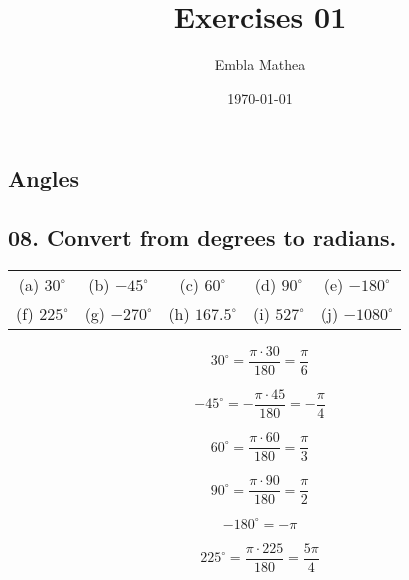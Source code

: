 \documentclass[12pt, a4paper]{article}
\title{Exercises 01}
\author{Embla Mathea}
\date{\today}
\begin{document}
\maketitle

\begin{center}
\section*{Angles}
\end{center}

\subsection*{08. Convert from degrees to radians.}

\begin{center}

\begin{tabular}{ c c c c c }
 (a) $30^\circ$ & (b) $-45^\circ$ & (c) $60^\circ$
 & (d) $90^\circ$ & (e) $-180^\circ$ \\  
 
 (f) $225^\circ$ & (g) $-270^\circ$ & (h) $167.5^\circ$
 & (i) $527^\circ$ & (j) $-1080^\circ$  
\end{tabular}

\end{center}

\begin{equation}
	\tag{a}
	30^\circ = \frac{\pi\cdot30}{180} = \frac{\pi}{6}
\end{equation}

\begin{equation}
	\tag{b}
	-45^\circ = -\frac{\pi\cdot45}{180} = -\frac{\pi}{4}
\end{equation}

\begin{equation}
	\tag{c}
	60^\circ = \frac{\pi\cdot60}{180} = \frac{\pi}{3}
\end{equation}

\begin{equation}
	\tag{d}
	90^\circ = \frac{\pi\cdot90}{180} = \frac{\pi}{2}
\end{equation}

\begin{equation}
	\tag{e}
	-180^\circ = -\pi
\end{equation}

\begin{equation}
	\tag{f}
	225^\circ = \frac{\pi\cdot225}{180} = \frac{5\pi}{4}
\end{equation}
\end{document}
